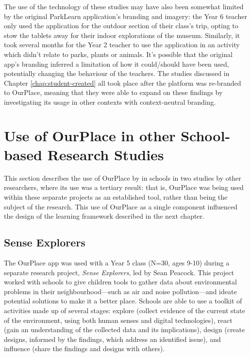 The use of the technology of these studies may have also been somewhat limited by the original ParkLearn application's branding and imagery: the Year 6 teacher only used the application for the outdoor section of their class’s trip, opting to stow the tablets away for their indoor explorations of the museum. Similarly, it took several months for the Year 2 teacher to use the application in an activity which didn’t relate to parks, plants or animals. It's possible that the original app's branding inferred a limitation of how it could/should have been used, potentially changing the behaviour of the teachers. The studies discussed in Chapter \ref{chap:student-created} all took place after the platform was re-branded to OurPlace, meaning that they were able to expand on these findings by investigating its usage in other contexts with context-neutral branding.

\section{Use of OurPlace in other School-based Research Studies}
This section describes the use of OurPlace by in schools in two studies by other researchers, where its use was a tertiary result: that is, OurPlace was being used within these separate projects as an established tool, rather than being the subject of the research. This use of OurPlace as a single component influenced the design of the learning framework described in the next chapter.

\subsection*{Sense Explorers}
\label{sec:SenseExplorers}

The OurPlace app was used with a Year 5 class (N=30, ages 9-10) during a separate research project, \textit{Sense Explorers}, led by Sean Peacock. This project worked with schools to give children tools to gather data about environmental problems in their neighbourhood---such as air and noise pollution---and ideate potential solutions to make it a better place. Schools are able to use a toolkit of activities made up of several stages: explore (collect evidence of the current state of the environment, using both human senses and digital technologies), react (gain an understanding of the collected data and its implications), design (create designs, informed by the findings, which address an identified issue), and influence (share the findings and designs with others). 

